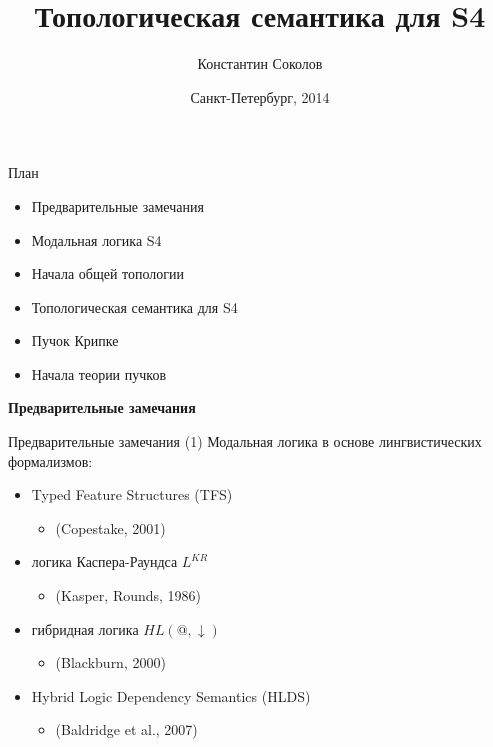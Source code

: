 \documentclass{beamer}
\begin{document}
\title{\Large{Топологическая семантика для S4}}
\author{Константин Соколов}
\date{Санкт-Петербург, 2014} 
\begin{frame}
    \thispagestyle{empty}
    \titlepage
\end{frame}

\begin{frame}{План}
    \setcounter{framenumber}{1}
    \begin{itemize}
    	\item Предварительные замечания
    	\item Модальная логика S4
        \item Начала общей топологии
        \item Топологическая семантика для S4
        \item Пучок Крипке
        \item Начала теории пучков
    \end{itemize}
\end{frame}

\begin{frame}{}
\begin{center}
	\textbf{Предварительные замечания}
\end{center}
\end{frame}

\begin{frame}{Предварительные замечания (1)}
Модальная логика в основе лингвистических формализмов:\\
\bigskip
\begin{itemize}
	\item Typed Feature Structures (TFS)
		\begin{itemize}
			\item (Copestake, 2001) 
		\end{itemize}
	\item логика Каспера-Раундса $L^{KR}$
		\begin{itemize}
			\item (Kasper, Rounds, 1986)
		\end{itemize}
	\item гибридная логика $HL(@, \downarrow)$
		\begin{itemize}
			\item (Blackburn, 2000)
		\end{itemize}
	\item Hybrid Logic Dependency Semantics (HLDS)
		\begin{itemize}
			\item (Baldridge et al., 2007)
		\end{itemize}
\end{itemize}
\end{frame}
\end{document}

